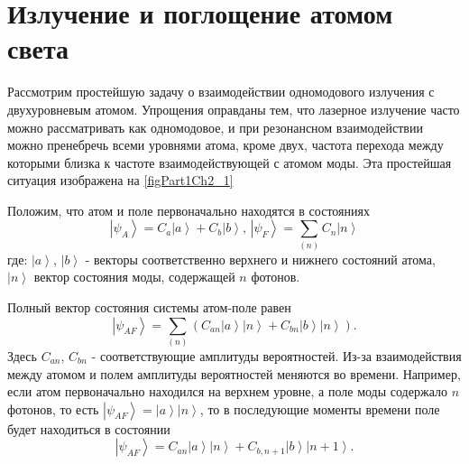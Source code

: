 \section{Излучение и поглощение атомом света}
Рассмотрим простейшую задачу о взаимодействии одномодового излучения с
двухуровневым атомом. Упрощения оправданы тем, что лазерное излучение
часто можно рассматривать как одномодовое, и при резонансном
взаимодействии можно пренебречь всеми уровнями атома, кроме двух,
частота перехода между которыми близка к частоте взаимодействующей с
атомом моды. Эта простейшая ситуация изображена на \autoref{figPart1Ch2_1}



Положим, что атом и поле первоначально находятся в состояниях
\begin{equation}
\left|\psi_A\right> = C_a\left|a\right> + C_b\left|b\right>, \,
\left|\psi_F\right> = \sum_{(n)}C_n\left|n\right>
\end{equation}
где:  $\left|a\right>$, $\left|b\right>$ - векторы соответственно
верхнего и нижнего состояний атома, $\left|n\right>$ вектор состояния
моды, содержащей  $n$  фотонов.
  
Полный вектор состояния системы атом-поле равен
\begin{equation}
\left|\psi_{AF}\right> = \sum_{(n)} 
\left(
C_{an}\left|a\right>\left|n\right> + 
C_{bn}\left|b\right>\left|n\right>
\right).
\end{equation}
Здесь $C_{an}$, $C_{bn}$ - соответствующие амплитуды
вероятностей. Из-за взаимодействия между атомом и полем
амплитуды вероятностей меняются во времени. Например, если
атом первоначально находился на верхнем уровне, а поле моды
содержало  $n$  фотонов, то есть  
$\left|\psi_{AF}\right> = \left|a\right>\left|n\right>$,
то в последующие моменты времени поле будет находиться в состоянии  
\begin{equation}
\left|\psi_{AF}\right> =
C_{an}\left|a\right>\left|n\right> + 
C_{b,n + 1}\left|b\right>\left|n + 1\right>.
\label{eq:part1:rabi_solution}
\end{equation}

